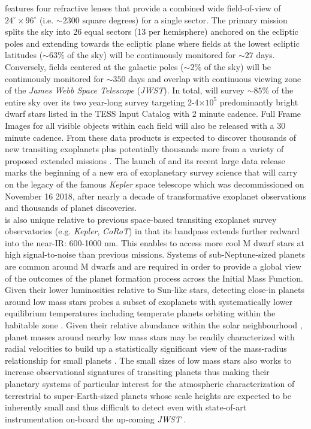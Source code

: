 \tess{} features four refractive lenses that provide a combined wide field-of-view of
$24^{\circ} \times 96^{\circ}$ (i.e. $\sim 2300$ square degrees) for a single sector. The primary
\tess{} mission splits the sky into 26 equal sectors (13 per hemisphere) anchored on the ecliptic
poles and extending towards the ecliptic plane where fields at the lowest ecliptic latitudes
($\sim 63$\% of the sky) will be continuously monitored for $\sim 27$ days. Conversely, fields
centered at the galactic poles ($\sim 2$\% of the sky) will be continuously monitored for
$\sim 350$ days and overlap with continuous viewing zone of the \emph{James Webb Space Telescope}
(\emph{JWST}). In total,  
\tess{} will survey $\sim 85$\% of the entire sky over its two year-long survey targeting
2-4$\times 10^5$ predominantly bright dwarf stars listed in the TESS Input Catalog
\citep[TIC;][]{stassun17} with 2 minute cadence.
Full Frame Images for all visible objects within each field will also be released with a 30 minute
cadence. From these data products \tess{}
is expected to discover thousands of new transiting exoplanets 
\citep{sullivan15,ballard18,barclay18} plus potentially thousands more from a variety of proposed
extended missions \citep{bouma17,huang18b}. The launch of \tess{}
and its recent large data release marks the beginning of a new era of exoplanetary survey
science that will carry on the legacy of the famous \emph{Kepler} space telescope which was
decommissioned on November 16 2018, after nearly a decade of transformative exoplanet observations
and thousands of planet discoveries. \\

\tess{} is also unique relative to previous space-based transiting exoplanet survey observatories
(e.g. \emph{Kepler}, \emph{CoRoT}) in that its bandpass extends further redward into the near-IR:
600-1000 nm. This enables \tess{} to access more cool M dwarf stars at high signal-to-noise
than previous missions. Systems of sub-Neptune-sized planets are common around M dwarfs
\citep{dressing13,morton14,dressing15a} and are required in order to provide a global view of the
outcomes of the planet formation process across the Initial Mass Function.
Given their lower luminosities relative
to Sun-like stars, detecting close-in planets around low mass stars probes a subset of exoplanets
with systematically lower equilibrium temperatures including temperate planets orbiting
within the habitable zone \citep{kasting93,kopparapu13}. Given their relative
abundance within the solar neighbourhood \citep{winters15}, planet masses around nearby low mass
stars may be
readily characterized with radial velocities to build up a statistically significant view of the
mass-radius relationship for small planets \citep{weiss14,rogers15,wolfgang16,chen17}. The small sizes
of low mass stars also works to
increase observational signatures of transiting planets thus making their planetary systems of
particular interest for the atmospheric characterization of terrestrial to super-Earth-sized planets
whose scale heights are expected to be inherently small \citep[$\lesssim$][]{millerricci09}
and thus difficult to detect even with state-of-art instrumentation on-board the up-coming
\emph{JWST} \citep{morley17}. \\

